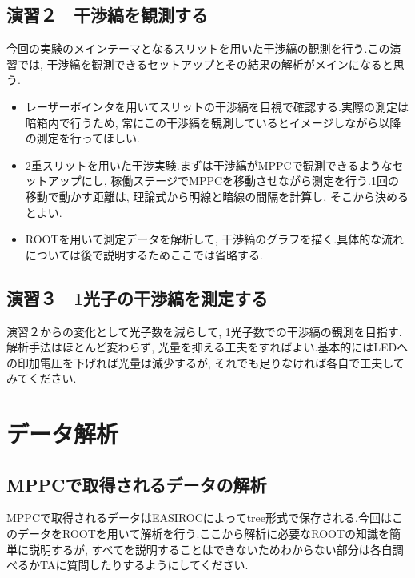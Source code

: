 \documentclass[uplatex,10pt,a4j]{jsarticle}
\begin{document}
\subsection{演習２　干渉縞を観測する}
今回の実験のメインテーマとなるスリットを用いた干渉縞の観測を行う.この演習では, 干渉縞を観測できるセットアップとその結果の解析がメインになると思う.
\begin{itemize}
  \item レーザーポインタを用いてスリットの干渉縞を目視で確認する.実際の測定は暗箱内で行うため, 常にこの干渉縞を観測しているとイメージしながら以降の測定を行ってほしい.
  \item 2重スリットを用いた干渉実験.まずは干渉縞がMPPCで観測できるようなセットアップにし, 稼働ステージでMPPCを移動させながら測定を行う.1回の移動で動かす距離は, 理論式から明線と暗線の間隔を計算し, そこから決めるとよい.
  \item ROOTを用いて測定データを解析して, 干渉縞のグラフを描く.具体的な流れについては後で説明するためここでは省略する.
\end{itemize}

\subsection{演習３　1光子の干渉縞を測定する}
演習２からの変化として光子数を減らして, 1光子数での干渉縞の観測を目指す.解析手法はほとんど変わらず, 光量を抑える工夫をすればよい.基本的にはLEDへの印加電圧を下げれば光量は減少するが, それでも足りなければ各自で工夫してみてください.

\clearpage






\section{データ解析}
\subsection{MPPCで取得されるデータの解析}
MPPCで取得されるデータはEASIROCによってtree形式で保存される.今回はこのデータをROOTを用いて解析を行う.ここから解析に必要なROOTの知識を簡単に説明するが, すべてを説明することはできないためわからない部分は各自調べるかTAに質問したりするようにしてください.




\clearpage

\end{document}
